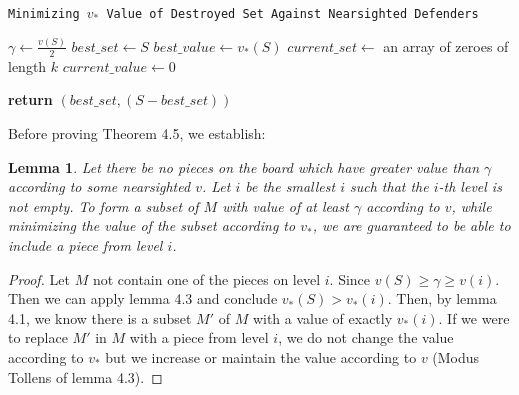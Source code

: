\documentclass{article}
\theoremstyle{plain}
\newtheorem{lem}[thm]{Lemma}
\theoremstyle{definition}
\theoremstyle{remark}
\begin{document}
\begin{center}
	\begin{minipage}{1\linewidth} %
		\begin{algorithm}[H]
			
			\caption{\texttt{Minimizing $v_{*}$ Value of Destroyed Set Against Nearsighted Defenders}} %
			\label{alg:nearsighted}   %
			
			
			\medskip
			$\gamma \leftarrow \frac{v(S)}{2}$\;
			$best\_set \leftarrow S$\;
			$best\_value \leftarrow v_{*}(S)$\;
			$current\_set \leftarrow $ an array of zeroes of length $k$\;
			$current\_value \leftarrow 0$\;
			\medskip
			
			 {
				 {
				}
			}
			\medskip
			{\bf return} $(best\_set, (S - best\_set))$\;
		\end{algorithm}
	\end{minipage}
\end{center}

Before proving Theorem 4.5, we establish:

\begin{lem}
	Let there be no pieces on the board which have greater value than $\gamma$ according to some nearsighted $v$. Let $i$ be the smallest $i$ such that the $i$-th level is not empty. To form a subset of $M$ with value of at least $\gamma$ according to $v$, while minimizing the value of the subset according to $v_{*}$, we are guaranteed to be able to include a piece from level $i$.
\end{lem}

\begin{proof}
	Let $M$ not contain one of the pieces on level $i$. Since $v(S) \ge \gamma \ge v(i)$. Then we can apply lemma 4.3 and conclude $v_{*}(S) > v_{*}(i)$. Then, by lemma 4.1, we know there is a subset $M'$ of $M$ with a value of exactly $v_{*}(i)$. If we were to replace $M'$ in $M$ with a piece from level $i$, we do not change the value according to $v_{*}$ but we increase or maintain the value according to $v$ (Modus Tollens of lemma 4.3). 
\end{proof}
\end{document}
